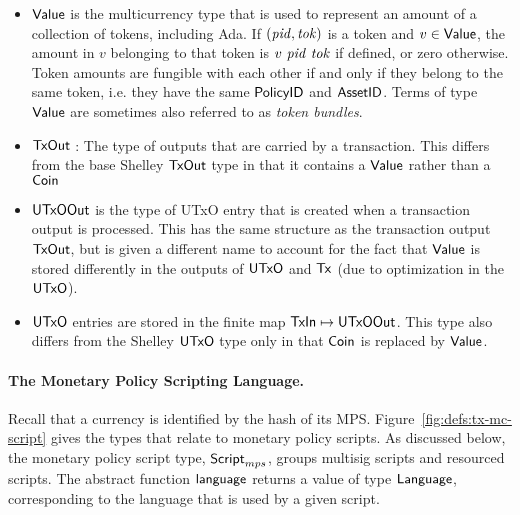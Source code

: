\begin{itemize}
  \item $\mathsf{Value}$ is the multicurrency type that is used to represent
    an amount of a collection of tokens, including Ada. If $(\mathit{pid}, \mathit{tok})$ is a token and $v \in \mathsf{Value}$,
    the amount in $v$ belonging to that token is $v~\mathit{pid}~\mathit{tok}$ if defined, or zero otherwise.
    Token amounts are fungible with each other if and only if they belong to the same token,
    i.e. they have the same $\mathsf{PolicyID}$ and $\mathsf{AssetID}$. Terms of type $\mathsf{Value}$ are sometimes also referred to as
    \emph{token bundles}.



\item $\mathsf{TxOut}$ : The type of outputs that are carried by a transaction. This differs from the base Shelley
  $\mathsf{TxOut}$ type in that it contains a $\mathsf{Value}$ rather than a $\mathsf{Coin}$

  \item $\mathsf{UTxOOut}$ is the type of UTxO entry that is created when a transaction
  output is processed. This has the same structure as
  the transaction output $\mathsf{TxOut}$, but is given a different name to
  account for the fact that $\mathsf{Value}$ is stored differently in the outputs of $\mathsf{UTxO}$ and $\mathsf{Tx}$
  (due to optimization in the $\mathsf{UTxO}$).

  \item $\mathsf{UTxO}$ entries are stored in the finite map $\mathsf{TxIn}\mapsto \mathsf{UTxOOut}$.
  This type also differs from the Shelley $\mathsf{UTxO}$ type only in that $\mathsf{Coin}$ is replaced by $\mathsf{Value}$.

\end{itemize}

\paragraph*{The Monetary Policy Scripting Language.}
Recall that a currency is identified by the hash of its MPS.
Figure~\ref{fig:defs:tx-mc-script} gives the types that relate to monetary
policy scripts. %
As discussed below, the monetary policy script type, $\mathsf{Script}_{mps}$, groups multisig scripts
and resourced scripts.
The abstract
function $\mathsf{language}$ returns a value of type $\mathsf{Language}$,
corresponding to the language that is used by a given script.


